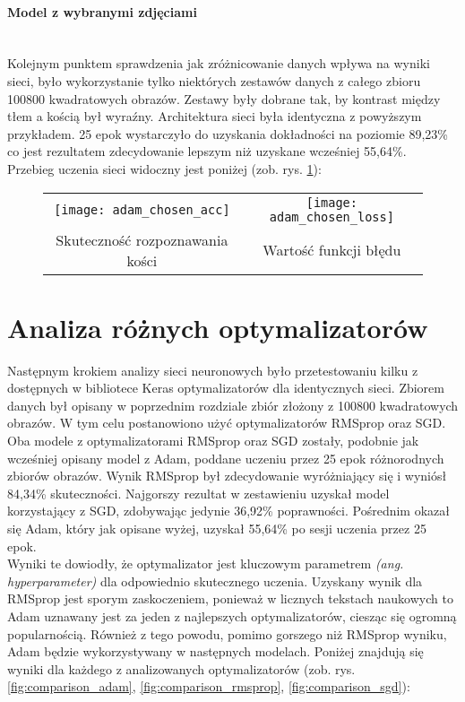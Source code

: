 \paragraph{Model z wybranymi zdjęciami} \mbox{}\\
Kolejnym punktem sprawdzenia jak zróżnicowanie danych wpływa na wyniki sieci, było
wykorzystanie tylko niektórych zestawów danych z całego zbioru 100800 kwadratowych obrazów.
Zestawy były dobrane tak, by kontrast między tłem a kością był wyraźny. Architektura sieci
była identyczna z powyższym przykładem. 25 epok wystarczyło do uzyskania dokładności
na poziomie 89,23\% co jest rezultatem zdecydowanie lepszym niż uzyskane wcześniej 55,64\%.\\
Przebieg uczenia sieci widoczny jest poniżej (zob. rys. \ref{fig:chosen_plots}): \newpage

\begin{figure}[h!]
\begin{center}
\begin{tabular}{cc}
\texttt{[image: adam\_chosen\_acc]} &
\texttt{[image: adam\_chosen\_loss]} \\
 Skuteczność rozpoznawania kości & Wartość funkcji błędu\\
\end{tabular}
\label{fig:chosen_plots}
\end{center}
\end{figure}

\section{Analiza różnych optymalizatorów}
Następnym krokiem analizy sieci neuronowych było przetestowaniu kilku z dostępnych
w bibliotece Keras optymalizatorów dla identycznych sieci. Zbiorem danych był
opisany w poprzednim rozdziale zbiór złożony z 100800 kwadratowych obrazów.
W tym celu postanowiono użyć optymalizatorów RMSprop oraz SGD.\\
Oba modele z optymalizatorami RMSprop oraz SGD zostały, podobnie jak wcześniej opisany model
z Adam, poddane uczeniu przez 25 epok różnorodnych zbiorów obrazów. Wynik RMSprop
był zdecydowanie wyróżniający się i wyniósł 84,34\% skuteczności. Najgorszy rezultat w zestawieniu
uzyskał model korzystający z SGD, zdobywając jedynie 36,92\% poprawności. Pośrednim okazał
się Adam, który jak opisane wyżej, uzyskał 55,64\% po sesji uczenia przez 25 epok.\\
Wyniki te dowiodły, że optymalizator jest kluczowym parametrem \textit{(ang. hyperparameter)}
dla odpowiednio skutecznego uczenia. Uzyskany wynik dla RMSprop jest sporym zaskoczeniem,
ponieważ w licznych tekstach naukowych to Adam uznawany jest za jeden z najlepszych
optymalizatorów, ciesząc się ogromną popularnością. Również z tego powodu, pomimo
gorszego niż RMSprop wyniku, Adam będzie wykorzystywany w następnych modelach.
Poniżej znajdują się wyniki dla każdego z analizowanych optymalizatorów
(zob. rys. \ref{fig:comparison_adam}, \ref{fig:comparison_rmsprop}, \ref{fig:comparison_sgd}):

